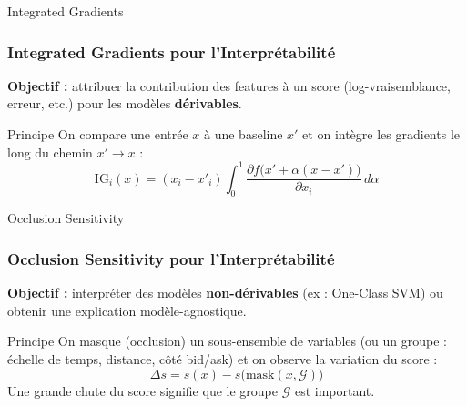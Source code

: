 \documentclass{beamer}
\begin{document}
\begin{frame}{Integrated Gradients}
    \frametitle{Integrated Gradients pour l'Interprétabilité}
    \textbf{Objectif :} attribuer la contribution des features à un score (log-vraisemblance, erreur, etc.) pour les modèles \textbf{dérivables}.

    \begin{block}{Principe}
        On compare une entrée $x$ à une baseline $x'$ et on intègre les gradients le long du chemin $x' \rightarrow x$ :
        \[
        \mathrm{IG}_i(x)=(x_i-x'_i)\int_{0}^{1}\frac{\partial f\big(x' + \alpha(x-x')\big)}{\partial x_i}\,d\alpha
        \]
    \end{block}
\end{frame}

\begin{frame}{Occlusion Sensitivity}
    \frametitle{Occlusion Sensitivity pour l'Interprétabilité}
    \textbf{Objectif :} interpréter des modèles \textbf{non-dérivables} (ex : One-Class SVM) ou obtenir une explication modèle-agnostique.

    \begin{block}{Principe}
        On masque (occlusion) un sous-ensemble de variables (ou un groupe : échelle de temps, distance, côté bid/ask) et on observe la variation du score :
        \[
        \Delta s = s(x) - s\big(\mathrm{mask}(x,\mathcal{G})\big)
        \]
        Une grande chute du score signifie que le groupe $\mathcal{G}$ est important.
    \end{block}
\end{frame}
\end{document}
